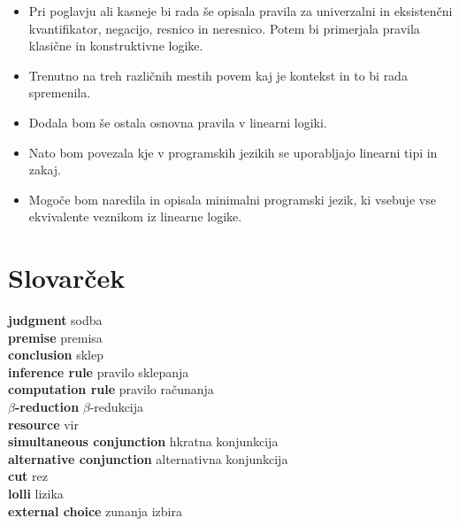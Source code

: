 \documentclass[12pt, titlepage, a4paper]{article}
\newcommand{\geslo}[2]{\textbf{#1} #2 \\}
\begin{document}
\begin{itemize}
  \item Pri poglavju  ali kasneje bi rada še opisala pravila za univerzalni in eksistenčni kvantifikator, negacijo, resnico in neresnico. Potem bi primerjala pravila klasične in konstruktivne logike.
  \item Trenutno na treh različnih mestih povem kaj je kontekst in to bi rada spremenila.
  \item Dodala bom še ostala osnovna pravila v linearni logiki.
  \item Nato bom povezala kje v programskih jezikih se uporabljajo linearni tipi in zakaj.
  \item Mogoče bom naredila in opisala minimalni programski jezik, ki vsebuje vse ekvivalente veznikom iz linearne logike.
  
\end{itemize}



\section{Slovarček}

\geslo{judgment}{sodba}
\geslo{premise}{premisa}
\geslo{conclusion}{sklep}
\geslo{inference rule}{pravilo sklepanja}
\geslo{computation rule}{pravilo računanja}
\geslo{\(\beta\)-reduction}{\(\beta\)-redukcija}
\geslo{resource}{vir}
\geslo{simultaneous conjunction}{hkratna konjunkcija}
\geslo{alternative conjunction}{alternativna konjunkcija}
\geslo{cut}{rez}
\geslo{lolli}{lizika}
\geslo{external choice}{zunanja izbira}




\end{document}

